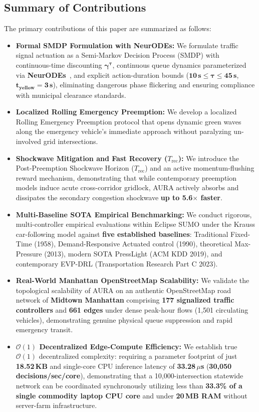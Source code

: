 \subsection{Summary of Contributions}
The primary contributions of this paper are summarized as follows:
\begin{itemize}
    \item \textbf{Formal SMDP Formulation with NeurODEs:} We formulate traffic signal actuation as a Semi-Markov Decision Process (SMDP) with continuous-time discounting $\mathbf{\gamma^{\tau}}$, continuous queue dynamics parameterized via \textbf{NeurODEs}~\cite{chen2018neural}, and explicit action-duration bounds ($\mathbf{10\,\text{s} \le \tau \le 45\,\text{s}}$, $\mathbf{t_{\text{yellow}} = 3\,\text{s}}$), eliminating dangerous phase flickering and ensuring compliance with municipal clearance standards.
    \item \textbf{Localized Rolling Emergency Preemption:} We develop a localized Rolling Emergency Preemption protocol that opens dynamic green waves along the emergency vehicle's immediate approach without paralyzing un-involved grid intersections.
    \item \textbf{Shockwave Mitigation and Fast Recovery ($T_{\text{rec}}$):} We introduce the Post-Preemption Shockwave Horizon ($T_{\text{rec}}$) and an active momentum-flushing reward mechanism, demonstrating that while contemporary preemption models induce acute cross-corridor gridlock, AURA actively absorbs and dissipates the secondary congestion shockwave \textbf{up to 5.6$\times$ faster}.
    \item \textbf{Multi-Baseline SOTA Empirical Benchmarking:} We conduct rigorous, multi-controller empirical evaluations within Eclipse SUMO under the Krauss car-following model against \textbf{five established baselines}: Traditional Fixed-Time (1958), Demand-Responsive Actuated control (1990), theoretical Max-Pressure (2013), modern SOTA PressLight (ACM KDD 2019), and contemporary EVP-DRL (Transportation Research Part C 2023).
    \item \textbf{Real-World Manhattan OpenStreetMap Scalability:} We validate the topological scalability of AURA on an authentic OpenStreetMap road network of \textbf{Midtown Manhattan} comprising \textbf{177 signalized traffic controllers} and \textbf{661 edges} under dense peak-hour flows (1,501 circulating vehicles), demonstrating genuine physical queue suppression and rapid emergency transit.
    \item \textbf{$\mathcal{O}(1)$ Decentralized Edge-Compute Efficiency:} We establish true $\mathcal{O}(1)$ decentralized complexity: requiring a parameter footprint of just \textbf{18.52\,KB} and single-core CPU inference latency of \textbf{33.28\,$\mu$s} (\textbf{30,050 decisions/sec/core}), demonstrating that a 10,000-intersection statewide network can be coordinated synchronously utilizing less than \textbf{33.3\% of a single commodity laptop CPU core} and under \textbf{20\,MB RAM} without server-farm infrastructure.
\end{itemize}

